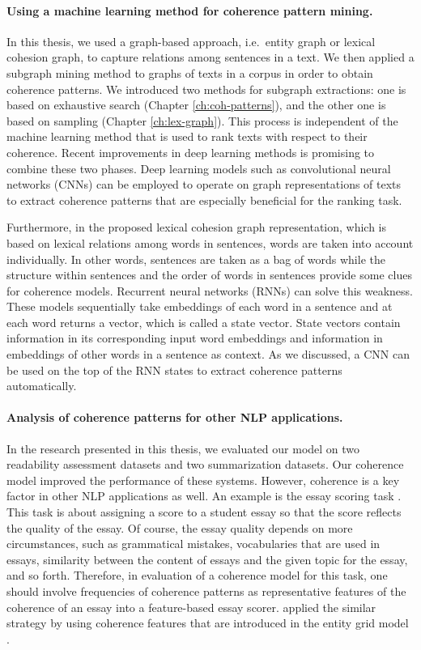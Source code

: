 \paragraph{Using a machine learning method for coherence pattern mining.} 
In this thesis, we used a graph-based approach, i.e.\ entity graph or lexical cohesion graph, to capture relations among sentences in a text. 
We then applied a subgraph mining method to graphs of texts in a corpus in order to obtain coherence patterns. 
We introduced two methods for subgraph extractions: one is based on exhaustive search (Chapter \ref{ch:coh-patterns}), and the other one is based on sampling (Chapter \ref{ch:lex-graph}). 
This process is independent of the machine learning method that is used to rank texts with respect to their coherence. 
Recent improvements in deep learning methods is promising to combine these two phases. 
Deep learning models such as convolutional neural networks (CNNs) \cite{kimyoon14} can be employed to operate on graph representations of texts to extract coherence patterns that are especially beneficial for the ranking task. 

Furthermore, in the proposed lexical cohesion graph representation, which is based on lexical relations among words in sentences, words are taken into account individually. 
In other words, sentences are taken as a bag of words while the structure within sentences \cite{louis12} and the order of words in sentences provide some clues for coherence models. 
Recurrent neural networks (RNNs) can solve this weakness. 
These models sequentially take embeddings of each word in a sentence and at each word returns a vector, which is called a state vector.  
State vectors contain information in its corresponding input word embeddings and information in embeddings of other words in a sentence as context.  
As we discussed, a CNN can be used on the top of the RNN states to extract coherence patterns automatically. 

\paragraph{Analysis of coherence patterns for other NLP applications.}
In the research presented in this thesis, we evaluated our model on two readability assessment datasets and two summarization datasets. 
Our coherence model improved the performance of these systems. 
However, coherence is a key factor in other NLP applications as well. 
An example is the essay scoring task \cite{dikli06,higgins04,miltsakaki04a,}.  
This task is about assigning a score to a student essay so that the score reflects the quality of the essay. 
Of course, the essay quality depends on more circumstances, such as grammatical mistakes, vocabularies that are used in essays, similarity between the content of essays and the given topic for the essay, and so forth. 
Therefore, in evaluation of a coherence model for this task, one should involve frequencies of coherence patterns as representative features of the coherence of an essay into a feature-based essay scorer. 
 applied the similar strategy by using coherence features that are introduced in the entity grid model \cite{barzilay05a}. 

